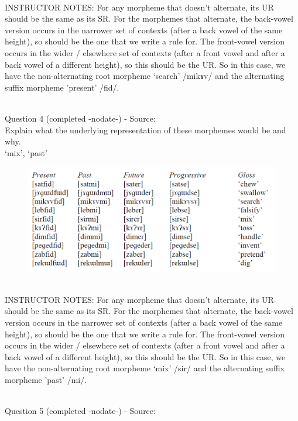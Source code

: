 \documentclass[12pt]{article}
\begin{document}
~\\
INSTRUCTOR NOTES: For any morpheme that doesn’t alternate, its UR should be the same as its SR.  For the morphemes that alternate, the back-vowel version occurs in the narrower set of contexts (after a back vowel of the same height), so should be the one that we write a rule for. The front-vowel version occurs in the wider / elsewhere set of contexts (after a front vowel and after a back vowel of a different height), so this should be the UR. So in this case, we have the non-alternating root morpheme ‘search’ /mikɤv/ and the alternating suffix morpheme 'present' /fid/.


~\\

{\large Question 4} (completed -nodate-) - Source: \\

Explain what the underlying representation of these morphemes would be and why.\\

`mix', `past'

\begin{figure}[H]
\includegraphics{../images/final_dataset.png}
\end{figure}

~\\
INSTRUCTOR NOTES: For any morpheme that doesn’t alternate, its UR should be the same as its SR.  For the morphemes that alternate, the back-vowel version occurs in the narrower set of contexts (after a back vowel of the same height), so should be the one that we write a rule for. The front-vowel version occurs in the wider / elsewhere set of contexts (after a front vowel and after a back vowel of a different height), so this should be the UR. So in this case, we have the non-alternating root morpheme ‘mix’ /sir/ and the alternating suffix morpheme 'past' /mi/.


~\\

{\large Question 5} (completed -nodate-) - Source: \\
\end{document}
